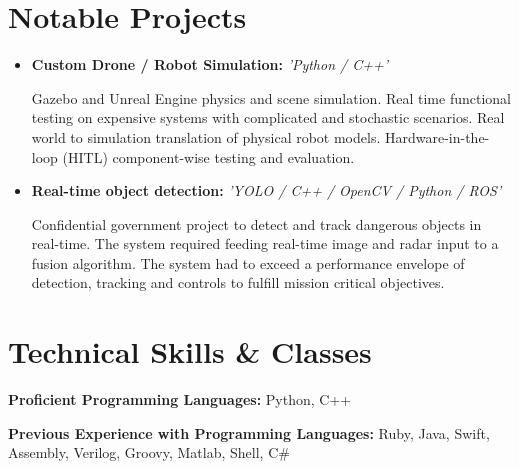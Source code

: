 \documentclass[11pt,a4paper,sans]{moderncv}        %
\begin{document}
\section{Notable Projects}

\vspace{5pt}

\begin{itemize}

\item{\textbf{Custom Drone / Robot Simulation:} \textit{'Python / C++'}

\vspace{5pt}

\small{Gazebo and Unreal Engine physics and scene simulation. Real time functional testing on expensive systems with complicated and stochastic scenarios. Real world to simulation translation of physical robot models. Hardware-in-the-loop (HITL) component-wise testing and evaluation.}}

\vspace{6pt}

\item{\textbf{Real-time object detection:} \textit{'YOLO / C++ / OpenCV / Python / ROS'}

\vspace{5pt}

\small{Confidential government project to detect and track dangerous objects in real-time. The system required feeding real-time image and radar input  to a fusion algorithm. The system had to exceed a performance envelope of detection, tracking and controls to fulfill mission critical objectives. }}

\vspace{6pt}

\end{itemize}

\section{Technical Skills \& Classes}

\vspace{2pt}

\textbf{Proficient Programming Languages:} Python, C++

\vspace{3pt}

\textbf{Previous Experience with Programming Languages:} Ruby, Java, Swift, Assembly, Verilog, Groovy, Matlab, Shell, C\#

\vspace{6pt}
\end{document}
